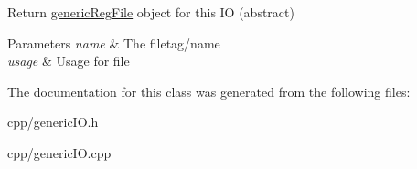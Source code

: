Return \hyperlink{class_s_e_p_1_1generic_reg_file}{generic\+Reg\+File} object for this IO (abstract) 


\begin{DoxyParams}{Parameters}
{\em name} & The filetag/name \\
\hline
{\em usage} & Usage for file \\
\hline
\end{DoxyParams}


The documentation for this class was generated from the following files\+:\begin{DoxyCompactItemize}
\item 
cpp/generic\+I\+O.\+h\item 
cpp/generic\+I\+O.\+cpp\end{DoxyCompactItemize}
